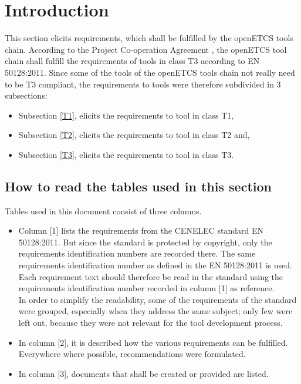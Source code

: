 \documentclass{template/openetcs_report}
\begin{document}
\section{Introduction}
This section elicits requirements, which shall be fulfilled by the openETCS tools chain.
According to the Project Co-operation Agreement \cite{PCA12}, the openETCS tool chain shall fulfill the requirements of tools in class T3 according to EN 50128:2011. Since some of the tools of the openETCS tools chain not really need to be T3 compliant, the requirements to tools were therefore subdivided in 3 subsections:
\begin{itemize}\itemsep=0pt
  \item Subsection \ref{T1}, elicits the requirements to tool in class T1,
  \item Subsection \ref{T2}, elicits the requirements to tool in class T2 and,
  \item Subsection \ref{T3}, elicits the requirements to tool in class T3.
\end{itemize}

\subsection{How to read the tables used in this section}
Tables used in this document consist of three columns.
\begin{itemize}\itemsep=0pt
  \item Column [1] lists the requirements from the CENELEC standard EN 50128:2011. But since the standard is protected by copyright, only the requirements identification numbers are recorded there. The same requirements identification number as defined in the EN 50128:2011 is used. Each requirement text should therefore be read in the standard using the requirements identification number recorded in column [1] as reference.\\
In order to simplify the readability, some of the requirements of the standard were grouped, especially when they address the same subject; only few were left out, because they were not relevant for the tool development process.
  \item In column [2], it is described how the various requirements can be fulfilled. Everywhere where possible, recommendations were formulated.
  \item In column [3], documents that shall be created or provided are listed.
\end{itemize}
\end{document}
